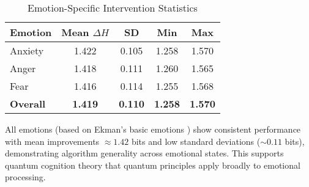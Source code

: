 \documentclass[11pt,letterpaper]{article}
\begin{document}
\begin{table}[h]
\centering
\caption{Emotion-Specific Intervention Statistics}
\label{tab:emotion_specific}
\begin{tabular}{lcccc}
\toprule
\textbf{Emotion} & \textbf{Mean $\Delta H$} & \textbf{SD} & \textbf{Min} & \textbf{Max} \\
\midrule
Anxiety & 1.422 & 0.105 & 1.258 & 1.570 \\
Anger & 1.418 & 0.111 & 1.260 & 1.565 \\
Fear & 1.416 & 0.114 & 1.255 & 1.568 \\
\midrule
\textbf{Overall} & \textbf{1.419} & \textbf{0.110} & \textbf{1.258} & \textbf{1.570} \\
\bottomrule
\end{tabular}
\end{table}

All emotions (based on Ekman's basic emotions \cite{ekman1992argument}) show consistent performance with mean improvements $\approx 1.42$ bits and low standard deviations ($\sim 0.11$ bits), demonstrating algorithm generality across emotional states. This supports quantum cognition theory \cite{busemeyer2012quantum} that quantum principles apply broadly to emotional processing.
\end{document}
